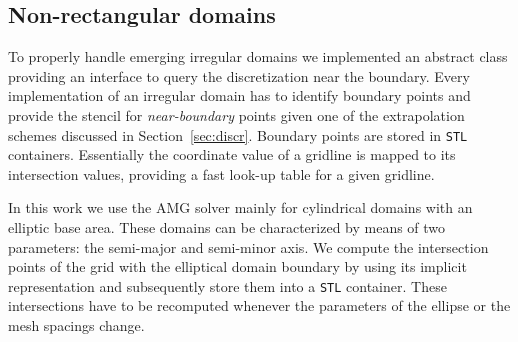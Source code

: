 \subsection*{Non-rectangular domains}

To properly handle emerging irregular domains we implemented an abstract
class providing an interface to query the discretization near the
boundary.  Every implementation of an irregular domain has to identify
boundary points and provide the stencil for \textit{near-boundary}
points given one of the extrapolation schemes discussed in
Section~\ref{sec:discr}.  Boundary points are stored in \texttt{STL}
containers. Essentially the coordinate value of a gridline is mapped to
its intersection values, providing a fast look-up table for a given
gridline.

In this work we use the AMG solver mainly for cylindrical domains with
an elliptic base area.  These domains can be characterized by means of
two parameters: the semi-major and semi-minor axis.  We compute the
intersection points of the grid with the elliptical domain boundary by
using its implicit representation and subsequently store them into a
\texttt{STL} container.  These intersections have to be recomputed
whenever the parameters of the ellipse or the mesh spacings change.





